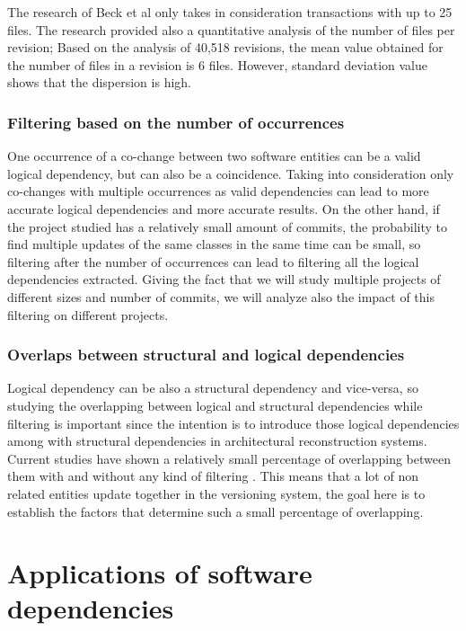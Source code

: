 \documentclass[12pt]{mitthesis}
\begin{document}
The research of Beck et al \cite{Beck:2011:CMC:2025113.2025162} only takes in consideration transactions with up to 25 files. The research \cite{Oliva:2011:ISL:2067853.2068086} provided also a quantitative analysis of the number of files per revision; Based on the analysis of 40,518 revisions, the mean value obtained for the number of files in a revision is 6 files. However, standard deviation value shows that the dispersion is high. 

\subsection{Filtering based on the number of occurrences}
One occurrence of a co-change between two software entities can be a valid logical dependency, but can also be a coincidence. Taking into consideration only co-changes with multiple occurrences as valid dependencies can lead to more accurate logical dependencies and more accurate results. On the other hand, if the project studied has a relatively small amount of commits, the probability to find multiple updates of the same classes in the same time can be small, so filtering after the number of occurrences can lead to filtering all the logical dependencies extracted. Giving the fact that we will study multiple projects of different sizes and number of commits, we will analyze also the impact of this filtering on different projects.

\subsection{Overlaps between structural and logical dependencies}
Logical dependency can be also a structural dependency and vice-versa, so studying the overlapping between logical and structural dependencies while filtering is important since the intention is to introduce those logical dependencies among with structural dependencies in architectural reconstruction systems. Current studies have shown a relatively small percentage of overlapping between them with and without any kind of filtering \cite{DBLP:journals/jss/AjienkaC17}. This means that a lot of non related entities update together in the versioning system, the goal here is to establish the factors that determine such a small percentage of overlapping.


\chapter{Applications of software dependencies}
\end{document}
